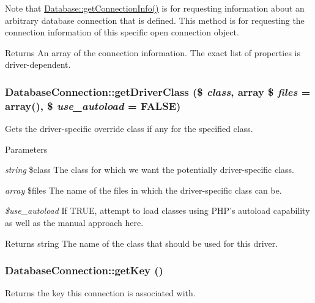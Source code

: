 Note that \hyperlink{classDatabase_a4ddbb695ae89b6180e0390c231b70ea5}{Database::getConnectionInfo()} is for requesting information about an arbitrary database connection that is defined. This method is for requesting the connection information of this specific open connection object.

\begin{DoxyReturn}{Returns}
An array of the connection information. The exact list of properties is driver-\/dependent. 
\end{DoxyReturn}
\hypertarget{classDatabaseConnection_a13497769ca9329dc4a62ad51b66566d4}{
\subsubsection[{getDriverClass}]{\setlength{\rightskip}{0pt plus 5cm}DatabaseConnection::getDriverClass (\$ {\em class}, \/  array \$ {\em files} = {\ttfamily array()}, \/  \$ {\em use\_\-autoload} = {\ttfamily FALSE})}}
\label{classDatabaseConnection_a13497769ca9329dc4a62ad51b66566d4}
Gets the driver-\/specific override class if any for the specified class.


\begin{DoxyParams}{Parameters}
\item[{\em string}]\$class The class for which we want the potentially driver-\/specific class. \item[{\em array}]\$files The name of the files in which the driver-\/specific class can be. \item[{\em \$use\_\-autoload}]If TRUE, attempt to load classes using PHP's autoload capability as well as the manual approach here. \end{DoxyParams}
\begin{DoxyReturn}{Returns}
string The name of the class that should be used for this driver. 
\end{DoxyReturn}
\hypertarget{classDatabaseConnection_ad7f059f5a02c65d2d805fe0991982e90}{
\subsubsection[{getKey}]{\setlength{\rightskip}{0pt plus 5cm}DatabaseConnection::getKey ()}}
\label{classDatabaseConnection_ad7f059f5a02c65d2d805fe0991982e90}
Returns the key this connection is associated with.

